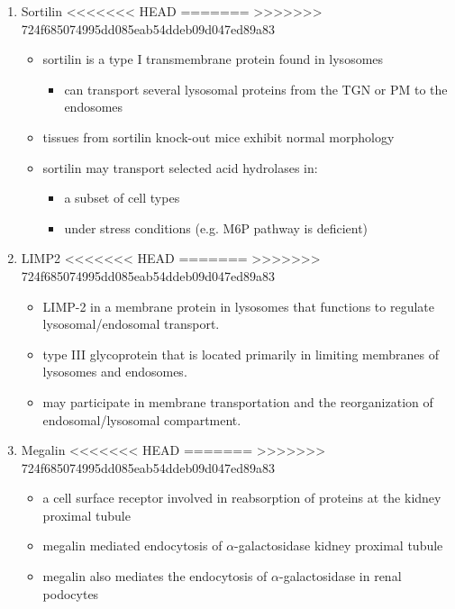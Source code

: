 \documentclass[fontsize=12pt]{scrartcl}
\begin{document}
\begin{enumerate}
\begin{enumerate}
\begin{enumerate}
\begin{enumerate}
\begin{table}[htbp]
\begin{enumerate}
\item Sortilin
<<<<<<< HEAD
\label{sec:orgb8363dd}
=======
\label{sec:org6cb2de9}
>>>>>>> 724f685074995dd085eab54ddeb09d047ed89a83
\begin{itemize}
\item sortilin is a type I transmembrane protein found in lysosomes
\begin{itemize}
\item can transport several lysosomal proteins from the TGN or PM to the endosomes
\end{itemize}
\item tissues from sortilin knock-out mice exhibit normal morphology
\item sortilin may transport selected acid hydrolases in:
\begin{itemize}
\item a subset of cell types
\item under stress conditions (e.g. M6P pathway is deficient)
\end{itemize}
\end{itemize}

\item LIMP2
<<<<<<< HEAD
\label{sec:org327bdd0}
=======
\label{sec:org836ff12}
>>>>>>> 724f685074995dd085eab54ddeb09d047ed89a83
\begin{itemize}
\item LIMP-2 in a membrane protein in lysosomes that functions to regulate lysosomal/endosomal transport.
\item type III glycoprotein that is located primarily in limiting membranes of lysosomes and endosomes.
\item may participate in membrane transportation and the reorganization of endosomal/lysosomal compartment.
\end{itemize}

\item Megalin
<<<<<<< HEAD
\label{sec:org904e167}
=======
\label{sec:org8419df1}
>>>>>>> 724f685074995dd085eab54ddeb09d047ed89a83
\begin{itemize}
\item a cell surface receptor involved in reabsorption of proteins at the kidney proximal tubule
\item megalin mediated endocytosis of \(\alpha\)-galactosidase kidney proximal tubule
\item megalin also mediates the endocytosis of \(\alpha\)-galactosidase in renal podocytes
\end{itemize}
\end{enumerate}


\end{table}
\end{enumerate}
\end{enumerate}
\end{enumerate}
\end{enumerate}
\end{document}

